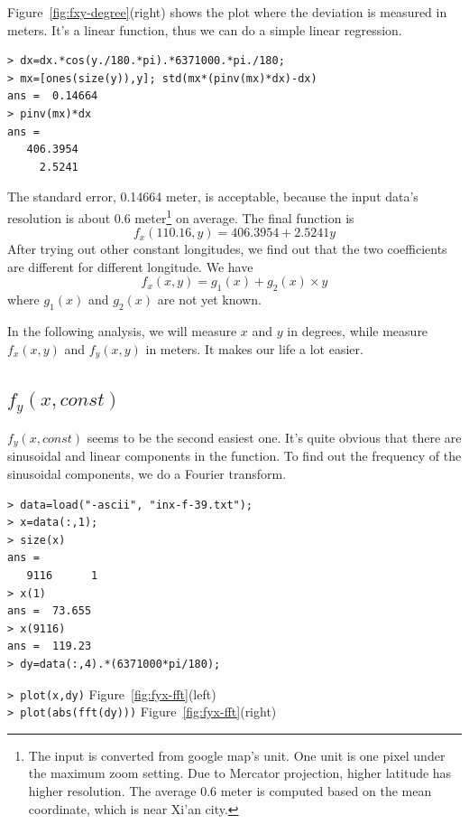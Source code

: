 \documentclass[a4paper]{article}
\begin{document}
Figure~\ref{fig:fxy-degree}(right) shows the plot where the deviation is
measured in meters.
It's a linear function, thus we can do a simple linear regression.
\begin{verbatim}
> dx=dx.*cos(y./180.*pi).*6371000.*pi./180;
> mx=[ones(size(y)),y]; std(mx*(pinv(mx)*dx)-dx)
ans =  0.14664
> pinv(mx)*dx
ans =
   406.3954
     2.5241
\end{verbatim}
The standard error, 0.14664 meter, is acceptable, because the input data's
resolution is about 0.6 meter\footnote{The input is converted from google map's
unit. One unit is one pixel under the maximum zoom setting. Due to Mercator
projection, higher latitude has higher resolution. The average 0.6 meter is
computed based on the mean coordinate, which is near Xi'an city.} on average.
The final function is
\begin{equation}
f_x(110.16,y)=406.3954+2.5241y
\end{equation}
After trying out other constant longitudes,
we find out that the two coefficients are different for different longitude.
We have
\begin{equation}
\label{eq:fxy}
f_x(x,y)=g_1(x)+g_2(x)\times y
\end{equation}
where $g_1(x)$ and $g_2(x)$ are not yet known.

In the following analysis, we will measure $x$ and $y$ in degrees, while
measure $f_x(x,y)$ and $f_y(x,y)$ in meters. It makes our life a lot easier.

\subsection{$f_y(x, const)$}
$f_y(x, const)$ seems to be the second easiest one. It's quite obvious that
there are sinusoidal and linear components in the function. To find out the
frequency of the sinusoidal components, we do a Fourier transform.

\begin{verbatim}
> data=load("-ascii", "inx-f-39.txt");
> x=data(:,1);
> size(x)
ans =
   9116      1
> x(1)
ans =  73.655
> x(9116)
ans =  119.23
> dy=data(:,4).*(6371000*pi/180);
\end{verbatim}
\verb|> plot(x,dy)| \hfill Figure~\ref{fig:fyx-fft}(left) \\
\verb|> plot(abs(fft(dy)))| \hfill Figure~\ref{fig:fyx-fft}(right)
\end{document}
